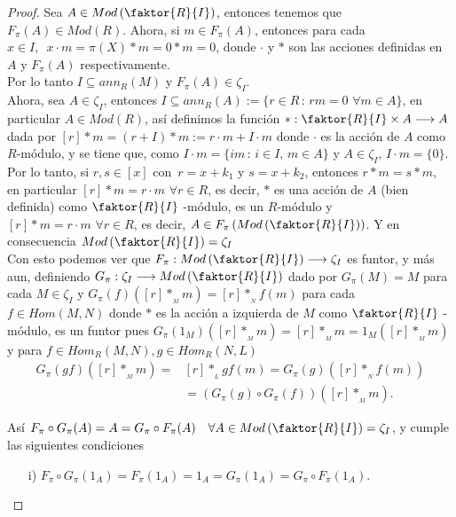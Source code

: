 \documentclass{article}
\begin{document}
\begin{enumerate}[label=\textbf{Ej \arabic*.}]
\begin{proof}
			 Sea $A\in Mod\left(\faktor{R}{I}\right)$, entonces tenemos que $F_\pi(A)\in Mod(R)$. Ahora, si $m\in F_\pi(A)$, entonces para cada $x\in I,
			\,\,\,x\cdot m=\pi(X)*m=0*m=0$, donde $\cdot$ y $*$ son las acciones definidas en $A$ y $F_\pi(A)$ respectivamente.\\
			Por lo tanto $I\subseteq ann_R(M)$ y $F_\pi(A)\in \zeta_I.$\\
			
			Ahora, sea $A\in \zeta_I$, entonces $I\subseteq ann_R(A):=\{r\in R\,:\,rm=0\,\,\forall m\in A\}$, en particular $A\in Mod(R)$, así 
			definimos la función $*:\faktor{R}{I}\times A\longrightarrow A$ dada por $[r]*m=(r+I)*m:=r\cdot m+I\cdot m$ donde $\cdot$ es la 
			acción de $A$ como $R$-módulo, y se tiene que, como $I\cdot m=\{im\,:\,i\in I,\, m\in A\}$ y $A\in \zeta_I$, $I\cdot m=\{0\}.$\\
			
			Por lo tanto, si $r,s\in [x]$ con $\, r=x+k_1$ y $s=x+k_2$, entonces $r*m=s*m,$ en particular $[r]*m=r\cdot m\,\,\forall r\in R$, es decir,
			$*$ es una acción de $A$ (bien definida) como $\faktor{R}{I}$ -módulo, es un $R$-módulo y $[r]*m=r\cdot m\,\,\forall r\in R$,
			es decir, $A\in F_\pi\left(Mod\left(\faktor{R}{I}\right)\right)$. Y en consecuencia $Mod\left(\faktor{R}{I}\right)=\zeta_I$\\
			
			Con esto podemos ver que $F_\pi:Mod\left(\faktor{R}{I}\right)\longrightarrow\zeta_I$ es funtor, y más aun, definiendo 
			$G_\pi:\zeta_I\longrightarrow Mod\left(\faktor{R}{I}\right)$ dado por $G_\pi(M)=M$ para cada $M\in \zeta_I$ y $G_\pi(f)([r]*_{{}_M} m)
			=[r]*_{{}_N}f(m)$ para cada $f\in Hom(M,N)$ donde $*$ es la acción a izquierda de $M$ como $\faktor{R}{I}$ -módulo,
			es un funtor pues $G_\pi(1_M)([r]*_{{}_M}m)=[r]*_{{}_M}m=1_M([r]*_{{}_M}m)$ y para $ f\in Hom_R(M,N), g\in Hom_R(N,L)$
			\begin{align*}
				G_\pi(gf)([r]*_{{}_M}m)=&[r]*_{{}_L}gf(m)=G_\pi(g)\left([r]*_{{}_N}f(m)\right)\\
				&=\left(G_\pi(g)\circ G_\pi(f)\right)([r]*_{{}_M}m).
			\end{align*}
			
			Así $F_\pi\circ G_\pi(A)=A=G_\pi\circ F_\pi(A)\quad \forall A\in Mod\left(\faktor{R}{I}\right)=\zeta_I$, y cumple las siguientes condiciones
			\begin{itemize}
				\item[i)] $F_\pi\circ G_\pi(1_A)=F_\pi(1_A)=1_A=G_\pi(1_A)=G_\pi\circ F_\pi(1_A)$.
				

\end{itemize}
\end{proof}
\end{enumerate}
\end{document}
